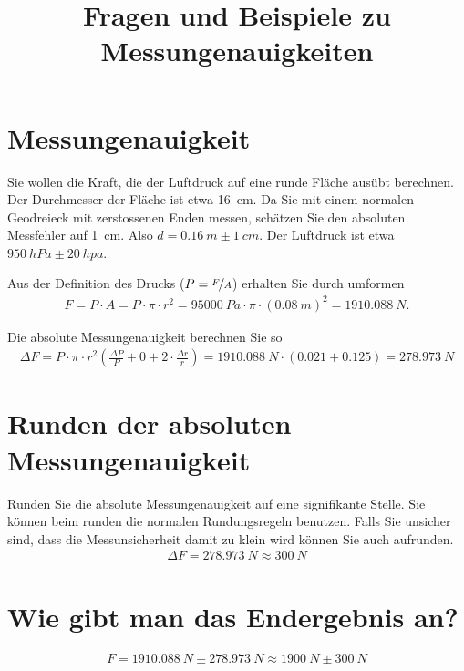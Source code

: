 \documentclass[12pt,a4paper, twosite]{article}
\author{}
\date{}
\title{Fragen und Beispiele zu Messungenauigkeiten}
\begin{document}
\maketitle

\section{Messungenauigkeit}
\Beispiel
Sie wollen die Kraft, die der Luftdruck auf eine runde Fläche ausübt berechnen.
Der Durchmesser der Fläche ist etwa \SI{16}{cm}. Da Sie mit einem normalen Geodreieck mit zerstossenen Enden messen,
schätzen Sie den absoluten Messfehler auf \SI{1}{cm}. Also $d=\SI{0.16}{m}\pm \SI{1}{cm}$.
Der Luftdruck ist etwa $\SI{950}{hPa} \pm \SI{20}{hpa}$.

Aus der Definition des Drucks ($P=\nicefrac{F}{A}$)
erhalten Sie durch umformen
\begin{eqnarray*}
	F=P\cdot A = P\cdot\pi \cdot r^2 = \SI{95000}{Pa}\cdot\pi\cdot(\SI{0.08}{m})^2 = \SI{1910.088}{N}\text{.}
\end{eqnarray*}

Die absolute Messungenauigkeit berechnen Sie so
\begin{eqnarray*}
	\Delta F= P\cdot\pi\cdot r^2\left(\frac{\Delta P}{P} + 0 + 2\cdot\frac{\Delta r}{r}\right)=\SI{1910.088}{N}\cdot\left(\num{0.021}+\num{0.125}\right)=\SI{278.973}{N}
\end{eqnarray*}


\section{Runden der absoluten Messungenauigkeit}
Runden Sie die absolute Messungenauigkeit auf eine signifikante Stelle.
Sie können beim runden die normalen Rundungsregeln benutzen. 
Falls Sie unsicher sind, dass die Messunsicherheit damit zu klein wird können Sie auch aufrunden.
\Beispiel
\begin{eqnarray*}
	\Delta F= \SI{278.973}{N} \approx \SI{300}{N}
\end{eqnarray*}

\section{Wie gibt man das Endergebnis an?}
\Beispiel
\begin{eqnarray*}
	F =  \SI{1910.088}{N} \pm  \SI{278.973}{N}\approx\SI{1900}{N}\pm\SI{300}{N} 
\end{eqnarray*}
\end{document}

